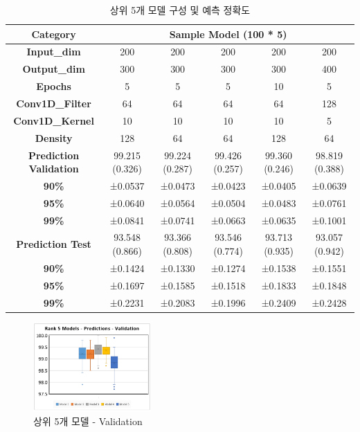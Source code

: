 \documentclass{kcc}
\begin{document}
\begin{table}
\centering
\setlength{\belowcaptionskip}{5pt}
\caption{상위 5개 모델 구성 및 예측 정확도}
\begin{tabular}{|c|c|c|c|c|c|}
\hline
\textbf{Category} & \multicolumn{5}{c|}{\textbf{Sample Model (100 * 5)}} \\
\hline
\textbf{Input\_dim} & 200 & 200 & 200 & 200 & 200 \\
\hline
\textbf{Output\_dim} & 300 & 300 & 300 & 300 & 400 \\
\hline
\textbf{Epochs} & 5 & 5 & 5 & 10 & 5 \\
\hline
\textbf{Conv1D\_Filter} & 64 & 64 & 64 & 64 & 128 \\
\hline
\textbf{Conv1D\_Kernel} & 10 & 10 & 10 & 10 & 5 \\
\hline
\textbf{Density} & 128 & 64 & 64 & 128 & 64 \\
\hline
\textbf{Prediction Validation} & 99.215 (0.326) & 99.224 (0.287) & 99.426 (0.257) & 99.360 (0.246) & 98.819 (0.388) \\
\hline
\textbf{90\%} & ±0.0537 & ±0.0473 & ±0.0423 & ±0.0405 & ±0.0639 \\
\hline
\textbf{95\%} & ±0.0640 & ±0.0564 & ±0.0504 & ±0.0483 & ±0.0761 \\
\hline
\textbf{99\%} & ±0.0841 & ±0.0741 & ±0.0663 & ±0.0635 & ±0.1001 \\
\hline
\textbf{Prediction Test} & 93.548 (0.866) & 93.366 (0.808) & 93.546 (0.774) & 93.713 (0.935) & 93.057 (0.942) \\
\hline
\textbf{90\%} & ±0.1424 & ±0.1330 & ±0.1274 & ±0.1538 & ±0.1551 \\
\hline
\textbf{95\%} & ±0.1697 & ±0.1585 & ±0.1518 & ±0.1833 & ±0.1848 \\
\hline
\textbf{99\%} & ±0.2231 & ±0.2083 & ±0.1996 & ±0.2409 & ±0.2428 \\
\hline
\end{tabular}
\label{summary}
\end{table}

\begin{figure}[!ht]
\centering
\includegraphics[width=0.4\textwidth]{figs/figure1}
\caption{상위 5개 모델 - Validation}
\label{fig:TOP5Validation}
\end{figure}
\end{document}
